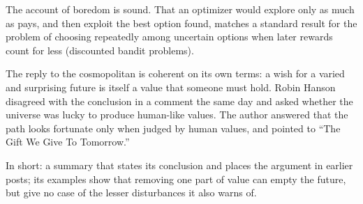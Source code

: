 \begin{afterword}
The account of boredom is sound. That an optimizer would explore only as much as pays, and then exploit the best option found, matches a standard result for the problem of choosing repeatedly among uncertain options when later rewards count for less (discounted bandit problems).

The reply to the cosmopolitan is coherent on its own terms: a wish for a varied and surprising future is itself a value that someone must hold. Robin Hanson disagreed with the conclusion in a comment the same day and asked whether the universe was lucky to produce human-like values. The author answered that the path looks fortunate only when judged by human values, and pointed to ``The Gift We Give To Tomorrow.''

In short: a summary that states its conclusion and places the argument in earlier posts; its examples show that removing one part of value can empty the future, but give no case of the lesser disturbances it also warns of.
\end{afterword}
